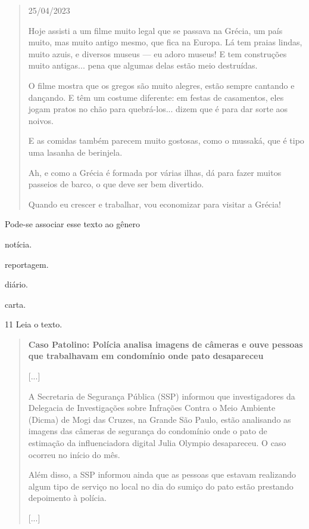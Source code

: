 \begin{quote}
25/04/2023

Hoje assisti a um filme muito legal que se passava na Grécia, um país
muito, mas muito antigo mesmo, que fica na Europa. Lá tem praias lindas,
muito azuis, e diversos museus --- eu adoro museus! E tem
construções muito antigas... pena que algumas delas estão meio
destruídas.

O filme mostra que os gregos são muito alegres, estão sempre cantando e
dançando. E têm um costume diferente: em festas de casamentos, eles
jogam pratos no chão para quebrá-los... dizem que é para dar sorte aos
noivos.

E as comidas também parecem muito gostosas, como o mussaká, que é tipo
uma lasanha de berinjela.

Ah, e como a Grécia é formada por várias ilhas, dá para fazer muitos
passeios de barco, o que deve ser bem divertido.

Quando eu crescer e trabalhar, vou economizar para visitar a Grécia!

\end{quote}

Pode-se associar esse texto ao gênero

\begin{escolha}
\item notícia.

\item reportagem.

\item diário.

\item carta.
\end{escolha}

\num{11} Leia o texto.

\begin{quote}
\textbf{Caso Patolino: Polícia analisa imagens de câmeras e ouve pessoas que trabalhavam em condomínio onde pato desapareceu}

{[}...{]}

A Secretaria de Segurança Pública (SSP) informou que investigadores da
Delegacia de Investigações sobre Infrações Contra o Meio Ambiente
(Dicma) de
Mogi
das Cruzes, na Grande São Paulo, estão analisando as imagens das
câmeras de segurança do condomínio onde
o
pato de estimação da influenciadora digital Julia Olympio desapareceu.
O caso ocorreu no início do mês.

Além disso, a SSP informou ainda que as pessoas que estavam realizando
algum tipo de serviço no local no dia do sumiço do pato estão prestando
depoimento à polícia.

{[}...{]}

\end{quote}

